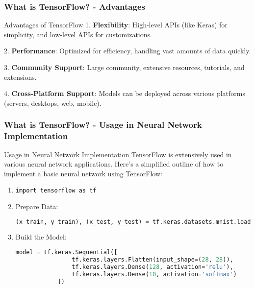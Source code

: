 \documentclass[aspectratio=169]{beamer}
\begin{document}
\begin{frame}[fragile]
    \frametitle{What is TensorFlow? - Advantages}
    \begin{block}{Advantages of TensorFlow}
    1. \textbf{Flexibility}: High-level APIs (like Keras) for simplicity, and low-level APIs for customizations.
    
    2. \textbf{Performance}: Optimized for efficiency, handling vast amounts of data quickly.
    
    3. \textbf{Community Support}: Large community, extensive resources, tutorials, and extensions.
    
    4. \textbf{Cross-Platform Support}: Models can be deployed across various platforms (servers, desktops, web, mobile).
    \end{block}
\end{frame}

\begin{frame}[fragile]
    \frametitle{What is TensorFlow? - Usage in Neural Network Implementation}
    \begin{block}{Usage in Neural Network Implementation}
    TensorFlow is extensively used in various neural network applications. Here’s a simplified outline of how to implement a basic neural network using TensorFlow:
    \end{block}
    
    \begin{enumerate}
        \item \texttt{import tensorflow as tf}
        \item Prepare Data:
            \begin{lstlisting}[basicstyle=\ttfamily, language=Python]
            (x_train, y_train), (x_test, y_test) = tf.keras.datasets.mnist.load_data()
            \end{lstlisting}
        \item Build the Model:
            \begin{lstlisting}[basicstyle=\ttfamily, language=Python]
            model = tf.keras.Sequential([
                tf.keras.layers.Flatten(input_shape=(28, 28)),
                tf.keras.layers.Dense(128, activation='relu'),
                tf.keras.layers.Dense(10, activation='softmax')
            ])
            \end{lstlisting}
    \end{enumerate}
\end{frame}
\end{document}
